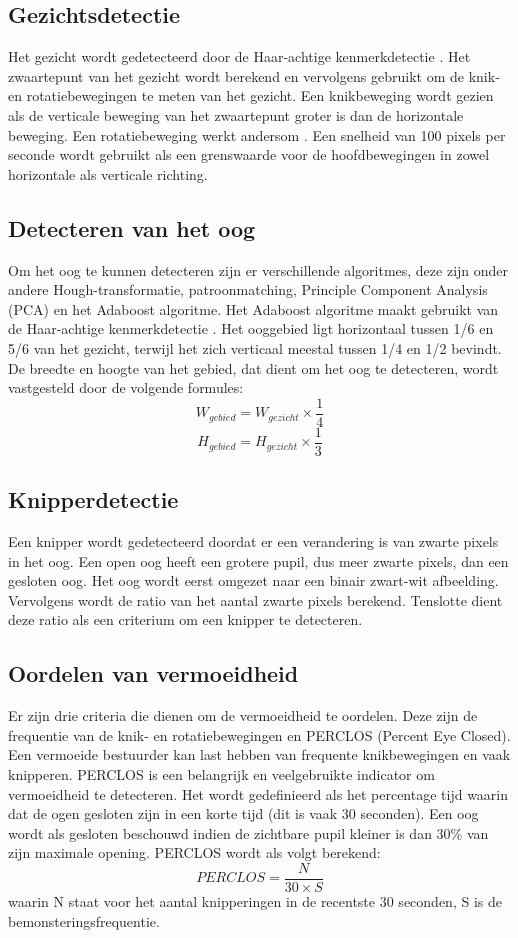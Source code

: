 \subsection{Gezichtsdetectie}
Het gezicht wordt gedetecteerd door de Haar-achtige kenmerkdetectie \autocite{Viola2004}. Het zwaartepunt van het gezicht wordt berekend en vervolgens gebruikt om de knik- en rotatiebewegingen te meten van het gezicht. Een knikbeweging wordt gezien als de verticale beweging van het zwaartepunt groter is dan de horizontale beweging. Een rotatiebeweging werkt andersom \autocite{Jibo2013}. Een snelheid van 100 pixels per seconde wordt gebruikt als een grenswaarde voor de hoofdbewegingen in zowel horizontale als verticale richting.
\subsection{Detecteren van het oog}
Om het oog te kunnen detecteren zijn er verschillende algoritmes, deze zijn onder andere Hough-transformatie, patroonmatching, Principle Component Analysis (PCA) en het Adaboost algoritme. Het Adaboost algoritme maakt gebruikt van de Haar-achtige kenmerkdetectie \autocite{Viola2004}. Het ooggebied ligt horizontaal tussen 1/6 en 5/6 van het gezicht, terwijl het zich verticaal meestal tussen 1/4 en 1/2 bevindt. De breedte en hoogte van het gebied, dat dient om het oog te detecteren, wordt vastgesteld door de volgende formules: \begin{equation*}W_{gebied} = W_{gezicht} \times \frac{1}{4} \end{equation*} \begin{equation*}H_{gebied} = H_{gezicht} \times \frac{1}{3} \end{equation*}
\subsection{Knipperdetectie}
Een knipper wordt gedetecteerd doordat er een verandering is van zwarte pixels in het oog. Een open oog heeft een grotere pupil, dus meer zwarte pixels, dan een gesloten oog. Het oog wordt eerst omgezet naar een binair zwart-wit afbeelding. Vervolgens wordt de ratio van het aantal zwarte pixels berekend. Tenslotte dient deze ratio als een criterium om een knipper te detecteren.
\subsection{Oordelen van vermoeidheid}
Er zijn drie criteria die dienen om de vermoeidheid te oordelen. Deze zijn de frequentie van de knik- en rotatiebewegingen en PERCLOS (Percent Eye Closed). Een vermoeide bestuurder kan last hebben van frequente knikbewegingen en vaak knipperen. PERCLOS is een belangrijk en veelgebruikte indicator om vermoeidheid te detecteren. Het wordt gedefinieerd als het percentage tijd waarin dat de ogen gesloten zijn in een korte tijd (dit is vaak 30 seconden). Een oog wordt als gesloten beschouwd indien de zichtbare pupil kleiner is dan 30\% van zijn maximale opening. PERCLOS wordt als volgt berekend: \begin{equation*}PERCLOS = \frac{N}{30\times S}\end{equation*} waarin N staat voor het aantal knipperingen in de recentste 30 seconden, S is de bemonsteringsfrequentie.